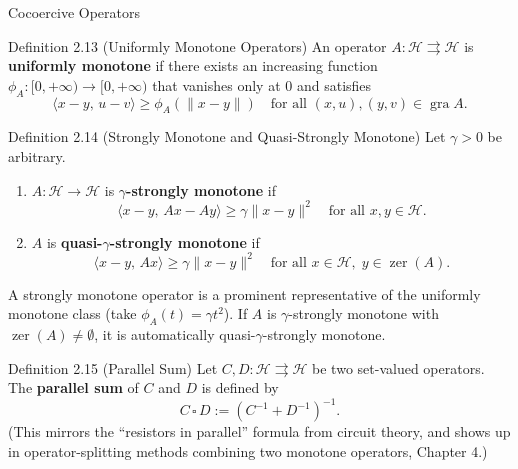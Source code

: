 \documentclass[aspectratio=169,10pt]{beamer}
\DeclareMathOperator{\gra}{gra}
\DeclareMathOperator{\zer}{zer}
\begin{document}
\begin{frame}[allowframebreaks]{Cocoercive Operators}
  \framebreak

  \begin{block}{Definition 2.13 (Uniformly Monotone Operators)}
    An operator $A : \mathcal{H} \rightrightarrows \mathcal{H}$ is
    \textbf{uniformly monotone} if there exists an increasing function
    $\phi_A : [0,+\infty) \to [0,+\infty)$ that vanishes only at $0$ and
    satisfies
    \[
      \langle x-y,\, u-v\rangle \ge \phi_A(\|x-y\|)
      \quad \text{for all } (x,u),(y,v) \in \gra A.
    \]
  \end{block}

  \begin{block}{Definition 2.14 (Strongly Monotone and Quasi-Strongly Monotone)}
    Let $\gamma > 0$ be arbitrary.
    \begin{enumerate}
      \item[(1)] $A : \mathcal{H} \to \mathcal{H}$ is
        \textbf{$\gamma$-strongly monotone} if
        \[
          \langle x-y,\, Ax - Ay\rangle \ge \gamma\|x-y\|^2
          \quad \text{for all } x,y \in \mathcal{H}.
        \]
      \item[(2)] $A$ is \textbf{quasi-$\gamma$-strongly monotone} if
        \[
          \langle x-y,\, Ax\rangle \ge \gamma\|x-y\|^2
          \quad \text{for all } x \in \mathcal{H},\; y \in \zer(A).
        \]
    \end{enumerate}
    A strongly monotone operator is a prominent representative of the
    uniformly monotone class (take $\phi_A(t) = \gamma t^2$). If $A$ is
    $\gamma$-strongly monotone with $\zer(A) \ne \emptyset$, it is
    automatically quasi-$\gamma$-strongly monotone.
  \end{block}

  \framebreak

  \begin{block}{Definition 2.15 (Parallel Sum)}
    Let $C, D : \mathcal{H} \rightrightarrows \mathcal{H}$ be two set-valued
    operators. The \textbf{parallel sum} of $C$ and $D$ is defined by
    \[
      C \,\square\, D := (C^{-1} + D^{-1})^{-1}.
    \]
    (This mirrors the ``resistors in parallel'' formula from circuit theory,
    and shows up in operator-splitting methods combining two monotone
    operators, Chapter 4.)
  \end{block}

\end{frame}
\end{document}
